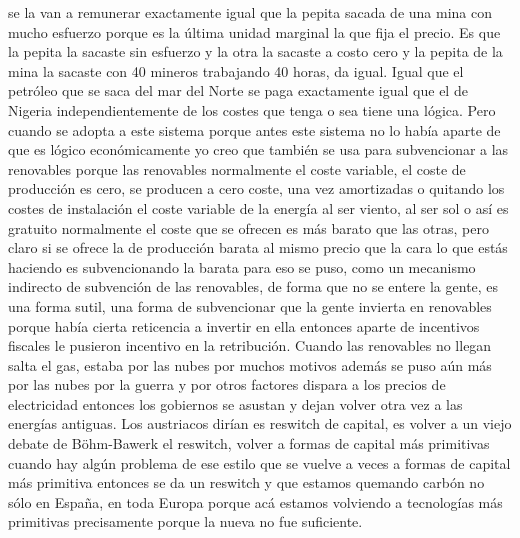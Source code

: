 se la van a remunerar exactamente igual que la pepita sacada de una mina con mucho esfuerzo porque es la última unidad marginal la que fija el precio. Es que la pepita la sacaste sin esfuerzo y la otra la sacaste a costo cero y la pepita de la mina la sacaste con 40 mineros trabajando 40 horas, da igual. Igual que el petróleo que se saca del mar del Norte se paga exactamente igual que el de Nigeria independientemente de los costes que tenga o sea tiene una lógica. Pero cuando se adopta a este sistema porque antes este sistema no lo había aparte de que es lógico económicamente yo creo que también se usa para subvencionar a las renovables porque las renovables normalmente el coste variable, el coste de producción es cero, se producen a cero coste, una vez amortizadas o quitando los costes de instalación el coste variable de la energía al ser viento, al ser sol o así es gratuito normalmente el coste que se ofrecen es más barato que las otras, pero claro si se ofrece la de producción barata al mismo precio que la cara lo que estás haciendo es subvencionando la barata para eso se puso, como un mecanismo indirecto de subvención de las renovables, de forma que no se entere la gente, es una forma sutil, una forma de subvencionar que la gente invierta en renovables porque había cierta reticencia a invertir en ella entonces aparte de incentivos fiscales le pusieron incentivo en la retribución. Cuando las renovables no llegan salta el gas, estaba por las nubes por muchos motivos además se puso aún más por las nubes por la guerra y por otros factores dispara a los precios de electricidad entonces los gobiernos se asustan y dejan volver otra vez a las energías antiguas. Los austriacos dirían es reswitch de capital, es volver a un viejo debate de Böhm-Bawerk el reswitch, volver a formas de capital más primitivas cuando hay algún problema de ese estilo que se vuelve a veces a formas de capital más primitiva entonces se da un reswitch y que estamos quemando carbón no sólo en España, en toda Europa porque acá estamos volviendo a tecnologías más primitivas precisamente porque la nueva no fue suficiente.

